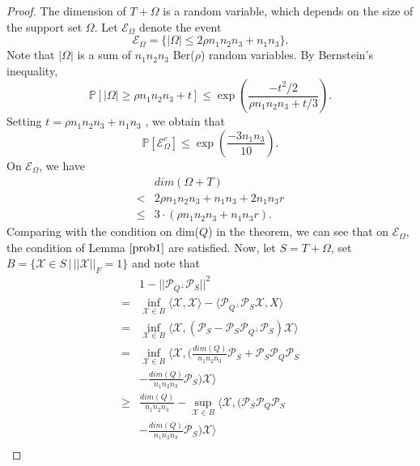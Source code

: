 \documentclass[journal,transmag]{IEEEtran}
\theoremstyle{plain}
\begin{document}
\begin{proof}
The dimension of $T+\Omega$ is a random variable, which depends on the size of the support set $\Omega$. Let $\mathcal{E}_{\Omega}$ denote the event
\begin{equation}
\mathcal{E}_{\Omega}=\{ |\Omega| \le 2\rho n_1 n_2 n_3 + n_1 n_3 \}.
\end{equation}
Note that $|\Omega|$ is a sum of $n_1 n_2 n_3$ Ber($\rho$) random variables. By Bernstein's inequality,
\begin{equation}
\mathbb{P}[|\Omega|\ge \rho n_1 n_2 n_3+t]\le\exp(\frac{-t^2/2}{\rho n_1 n_2 n_3 +t/3}).
\end{equation}
Setting $t= \rho n_1 n_2 n_3 + n_1 n_3$ , we obtain that
\begin{equation}
\mathbb{P}[\mathcal{E}^c_{\Omega}]\le \exp(\frac{-3n_1 n_3}{10}).
\end{equation}
On $\mathcal{E}_{\Omega}$, we have
\begin{equation}
\begin{split}
&dim(\Omega+T)\\
<& 2\rho n_1 n_2 n_3+n_1 n_3 +2n_1 n_3 r\\
\le & 3\cdot (\rho n_1 n_2 n_3+n_1 n_3 r).
\end{split}
\end{equation}
Comparing with the condition on dim($Q$) in the theorem, we can see that on $\mathcal{E}_{\Omega}$, the condition of Lemma $\ref{prob1}$ are satisfied. Now, let $S=T+\Omega$, set $B = \{ \mathcal{X}\in S\, | \, ||\mathcal{X}||_F = 1\}$ and note that
\begin{equation}
\begin{split}
&1 - ||\mathcal{P}_{Q^{\bot}}\mathcal{P}_S||^2 \\
=& \inf_{\mathcal{X}\in B}\langle\mathcal{X},\mathcal{X}\rangle-\langle\mathcal{P}_{Q^{\bot}}\mathcal{P}_S \mathcal{X},X\rangle \\
=& \inf_{\mathcal{X} \in B}\langle\mathcal{X},(\mathcal{P}_S-\mathcal{P}_S\mathcal{P}_{Q^{\bot}}\mathcal{P}_S)\mathcal{X}\rangle\\
=& \inf_{\mathcal{X}\in B}\langle\mathcal{X},(\frac{dim(Q)}{n_1 n_2 n_3}\mathcal{P}_S+\mathcal{P}_S\mathcal{P}_Q\mathcal{P}_S\\
&-\frac{dim(Q)}{n_1 n_2 n_3}\mathcal{P}_S)\mathcal{X}\rangle \\
\ge& \frac{dim(Q)}{n_1 n_2 n_3}-\sup_{\mathcal{X}\in B}\langle\mathcal{X},(\mathcal{P}_S\mathcal{P}_Q\mathcal{P}_S\\
&-\frac{dim(Q)}{n_1 n_2 n_3}\mathcal{P}_S)\mathcal{X}\rangle \\

\end{split}
\end{equation}
\end{proof}
\end{document}
